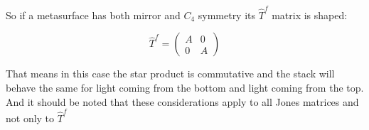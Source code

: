 So if a metasurface has both mirror and $C_4$ symmetry its $\hat T^f$ matrix is shaped:

\begin{equation}
    \hat T^f =
    \begin{pmatrix}
        A & 0 \\
        0 & A
    \end{pmatrix}
\end{equation}

That means in this case the star product is commutative and the stack will behave the same for light coming from the bottom and light coming from the top.
And it should be noted that these considerations apply to all Jones matrices and not only to $\hat T^f$
